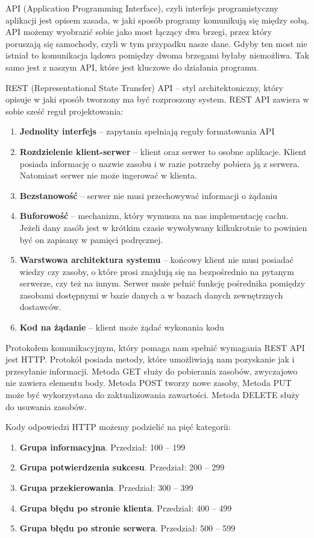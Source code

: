 \documentclass[a4paper,twoside,12pt]{book}
\begin{document}
API (Application Programming Interface), czyli interfejs programistyczny aplikacji jest opisem zasada, w jaki sposób programy komunikują się między sobą. API możemy wyobrazić sobie jako most łączący dwa brzegi, przez który poruszają się samochody, czyli w tym przypadku nasze dane. Gdyby ten most nie istniał to komunikacja lądowa pomiędzy dwoma brzegami byłaby niemożliwa. Tak samo jest z naszym API, które jest kluczowe do działania programu.  

REST (Representational State Transfer) API – styl architektoniczny, który opisuje w jaki sposób tworzony ma być rozproszony system. REST API zawiera w sobie sześć reguł projektowania: 
\begin{enumerate}
    \item \textbf{Jednolity interfejs} -- zapytania spełniają reguły formatowania API 
    \item \textbf{Rozdzielenie klient-serwer} -- klient oraz serwer to osobne aplikacje. Klient posiada informację o nazwie zasobu i w razie potrzeby pobiera ją z serwera. Natomiast serwer nie może ingerować w klienta. 
    \item \textbf{Bezstanowość} -- serwer nie musi przechowywać informacji o żądaniu 
    \item \textbf{Buforowość} -- mechanizm, który wymusza na nas implementację cachu. Jeżeli dany zasób jest w krótkim czasie wywoływany kilkukrotnie to powinien być on zapisany w pamięci podręcznej. 
    \item \textbf{Warstwowa architektura systemu} -- końcowy klient nie musi posiadać wiedzy czy zasoby, o które prosi znajdują się na bezpośrednio na pytanym serwerze, czy też na innym. Serwer może pełnić funkcję pośrednika pomiędzy zasobami dostępnymi w bazie danych a w bazach danych zewnętrznych dostawców. 
    \item \textbf{Kod na żądanie} -- klient może żądać wykonania kodu 
\end{enumerate}

Protokołem komunikacyjnym, który pomaga nam spełnić wymagania REST API jest HTTP. Protokół posiada metody, które umożliwiają nam pozyskanie jak i przesyłanie informacji. Metoda GET służy do pobierania zasobów, zwyczajowo nie zawiera elementu body. Metoda POST tworzy nowe zasoby, Metoda PUT może być wykorzystana do zaktualizowania zawartości. Metoda DELETE służy do usuwania zasobów.  

Kody odpowiedzi HTTP możemy podzielić na pięć kategorii: 
\begin{enumerate}
    \item \textbf{Grupa informacyjna}. Przedział: 100 – 199 
    \item \textbf{Grupa potwierdzenia sukcesu}. Przedział: 200 – 299  
    \item \textbf{Grupa przekierowania}. Przedział: 300 – 399  
    \item \textbf{Grupa błędu po stronie klienta}. Przedział: 400 – 499  
    \item \textbf{Grupa błędu po stronie serwera}. Przedział: 500 – 599  
\end{enumerate}
\end{document}
